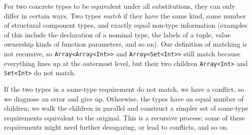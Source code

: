 \documentclass[../generics]{subfiles}
\begin{document}
For two concrete types to be equivalent under all substitutions, they can only differ in certain ways. Two types \emph{match} if they have the same kind, same number of structural component types, and exactly equal non-type information (examples of this include the declaration of a nominal type, the labels of a tuple, value ownership kinds of function parameters, and so on). Our definition of matching is not recursive, so \texttt{Array<Array<Int>>} and \texttt{Array<Set<Int>>} still match because everything lines up at the outermost level, but their two children \texttt{Array<Int>} and \texttt{Set<Int>} do not match.

If the two types in a same-type requirement do not match, we have a conflict, so we diagnose an error and give up. Otherwise, the types have an equal number of children; we walk the children in parallel and construct a simpler set of same-type requirements equivalent to the original. This is a recursive process; some of these requirements might need further desugaring, or lead to conflicts, and so on.
\end{document}
